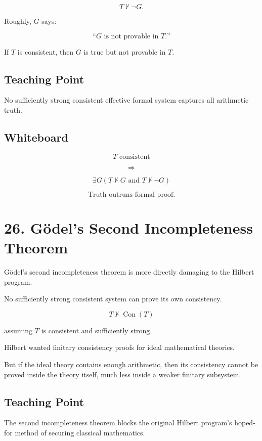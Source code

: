 \documentclass[11pt]{article}
\begin{document}
\[
T \nvdash \neg G.
\]

Roughly, \(G\) says:

\[
\text{``}G\text{ is not provable in }T\text{.''}
\]

If \(T\) is consistent, then \(G\) is true but not provable in \(T\).

\subsection*{Teaching Point}

No sufficiently strong consistent effective formal system captures all arithmetic truth.

\subsection*{Whiteboard}

\[
T \text{ consistent}
\]

\[
\Rightarrow
\]

\[
\exists G(T\nvdash G \text{ and } T\nvdash \neg G)
\]

\[
\text{Truth outruns formal proof.}
\]

\section*{26. G\"odel's Second Incompleteness Theorem}

G\"odel's second incompleteness theorem is more directly damaging to the Hilbert
program.

No sufficiently strong consistent system can prove its own consistency.

\[
\boxed{
T \nvdash \operatorname{Con}(T)
}
\]

assuming \(T\) is consistent and sufficiently strong.

Hilbert wanted finitary consistency proofs for ideal mathematical theories.

But if the ideal theory contains enough arithmetic, then its consistency cannot be proved
inside the theory itself, much less inside a weaker finitary subsystem.

\subsection*{Teaching Point}

The second incompleteness theorem blocks the original Hilbert program's hoped-for
method of securing classical mathematics.
\end{document}
